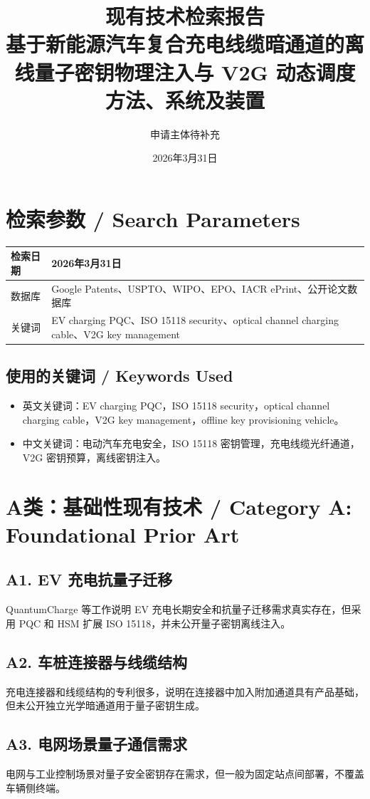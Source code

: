 ﻿\documentclass[12pt,a4paper]{article}
\title{\textbf{现有技术检索报告}\\[0.5em]\Large 基于新能源汽车复合充电线缆暗通道的离线量子密钥物理注入与 V2G 动态调度方法、系统及装置}
\author{申请主体待补充}
\date{2026年3月31日}
\begin{document}
\maketitle
\tableofcontents
\newpage
\section{检索参数 / Search Parameters}
\begin{tabular}{|p{4cm}|p{9cm}|}
\hline
检索日期 & 2026年3月31日 \\
\hline
数据库 & Google Patents、USPTO、WIPO、EPO、IACR ePrint、公开论文数据库 \\
\hline
关键词 & EV charging PQC、ISO 15118 security、optical channel charging cable、V2G key management \\
\hline
\end{tabular}

\subsection{使用的关键词 / Keywords Used}
\begin{itemize}
\item 英文关键词：EV charging PQC，ISO 15118 security，optical channel charging cable，V2G key management，offline key provisioning vehicle。
\item 中文关键词：电动汽车充电安全，ISO 15118 密钥管理，充电线缆光纤通道，V2G 密钥预算，离线密钥注入。
\end{itemize}

\section{A类：基础性现有技术 / Category A: Foundational Prior Art}
\subsection{A1. EV 充电抗量子迁移}
QuantumCharge 等工作说明 EV 充电长期安全和抗量子迁移需求真实存在，但采用 PQC 和 HSM 扩展 ISO 15118，并未公开量子密钥离线注入。

\subsection{A2. 车桩连接器与线缆结构}
充电连接器和线缆结构的专利很多，说明在连接器中加入附加通道具有产品基础，但未公开独立光学暗通道用于量子密钥生成。

\subsection{A3. 电网场景量子通信需求}
电网与工业控制场景对量子安全密钥存在需求，但一般为固定站点间部署，不覆盖车辆侧终端。
\end{document}
